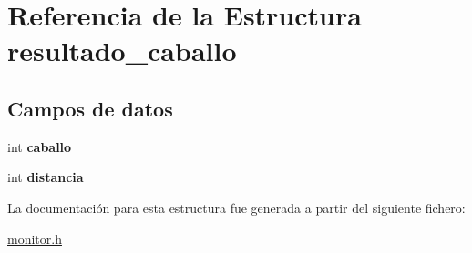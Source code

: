 \hypertarget{structresultado__caballo}{}\section{Referencia de la Estructura resultado\+\_\+caballo}
\label{structresultado__caballo}
\subsection*{Campos de datos}
\begin{DoxyCompactItemize}
\item 
\mbox{\label{structresultado__caballo_acb851e3b8c7f2cbfcb5bdfde46ad6956}} 
int {\bfseries caballo}
\item 
\mbox{\label{structresultado__caballo_a10b75a1cb4477881236b33491a5e1006}} 
int {\bfseries distancia}
\end{DoxyCompactItemize}


La documentación para esta estructura fue generada a partir del siguiente fichero\+:\begin{DoxyCompactItemize}
\item 
\hyperlink{monitor_8h}{monitor.\+h}\end{DoxyCompactItemize}
